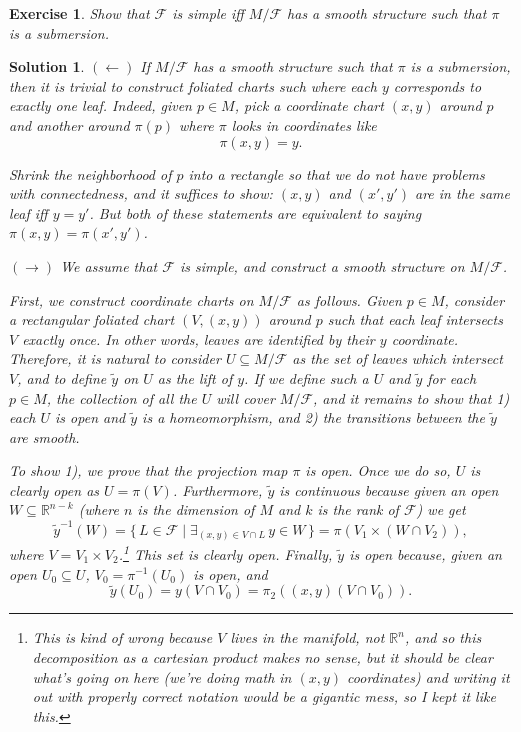 \documentclass{article}
\newtheorem{ex}{Exercise}
\theoremstyle{nonumberplain}
\newtheorem{sol}{Solution}
\newcommand{\R}{\mathbb{R}}
\newcommand{\FF}{\mathcal{F}}
\begin{document}
\begin{ex}
Show that $\FF$ is simple iff $M/\FF$ has a smooth structure such that $\pi$ is a submersion.
\end{ex}

\begin{sol}
$(\leftarrow)$ If $M/\FF$ has a smooth structure such that $\pi$ is a submersion, then it is trivial to construct foliated charts such where each $y$ corresponds to exactly one leaf. Indeed, given $p \in M$, pick a coordinate chart $(x,y)$ around $p$ and another around $\pi(p)$ where $\pi$ looks in coordinates like
\[\pi(x,y) = y.\]

Shrink the neighborhood of $p$ into a rectangle so that we do not have problems with connectedness, and it suffices to show: $(x,y)$ and $(x',y')$ are in the same leaf iff $y = y'$. But both of these statements are equivalent to saying $\pi(x,y) = \pi(x',y')$.

\medskip

$(\rightarrow)$ We assume that $\FF$ is simple, and construct a smooth structure on $M/\FF$.

First, we construct coordinate charts on $M/\FF$ as follows. Given $p \in M$, consider a rectangular foliated chart $(V, (x,y))$ around $p$ such that each leaf intersects $V$ exactly once. In other words, leaves are identified by their $y$ coordinate. Therefore, it is natural to consider $U \subseteq M/\FF$ as the set of leaves which intersect $V$, and to define $\tilde y$ on $U$ as the lift of $y$. If we define such a $U$ and $\tilde y$ for each $p \in M$, the collection of all the $U$ will cover $M/\FF$, and it remains to show that 1) each $U$ is open and $\tilde y$ is a homeomorphism, and 2) the transitions between the $\tilde y$ are smooth.

To show 1), we prove that the projection map $\pi$ is open. Once we do so, $U$ is clearly open as $U = \pi(V)$. Furthermore, $\tilde y$ is continuous because given an open $W \subseteq \R^{n-k}$ (where $n$ is the dimension of $M$ and $k$ is the rank of $\FF$) we get
\[\tilde y^{-1}(W) = \{\,L \in \FF \mid  \exists_{(x,y)\in V \cap L}\, y \in W \,\} = \pi(V_1 \times (W\cap V_2)),\]
where $V = V_1 \times V_2$.\footnote{This is kind of wrong because $V$ lives in the manifold, not $\R^n$, and so this decomposition as a cartesian product makes no sense, but it should be clear what's going on here (we're doing math in $(x,y)$ coordinates) and writing it out with properly correct notation would be a gigantic mess, so I kept it like this.}
This set is clearly open. Finally, $\tilde y$ is open because, given an open $U_0 \subseteq U$, $V_0 = \pi^{-1}(U_0)$ is open, and
\[\tilde y(U_0) = y(V \cap V_0) = \pi_2((x,y)(V \cap V_0)).\]


\end{sol}
\end{document}
